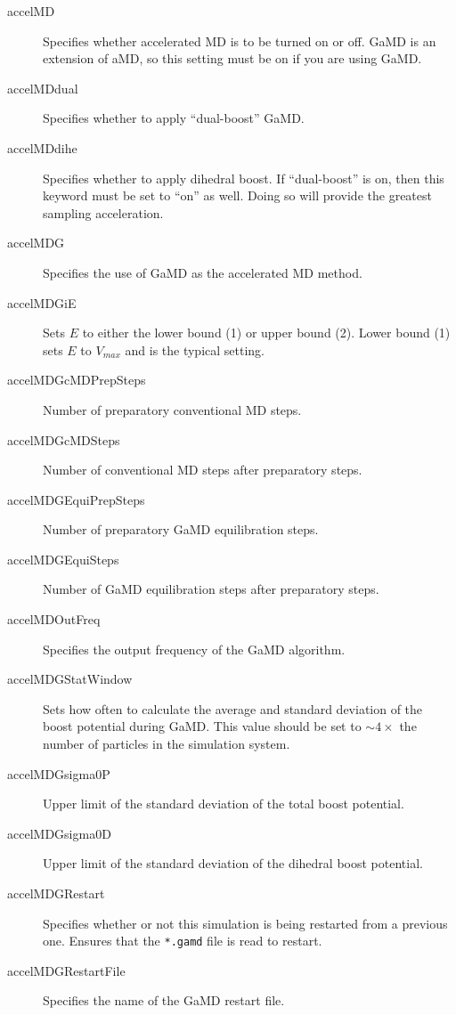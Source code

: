 \documentclass[9pt,tutorial]{livecoms}
\begin{document}
\begin{description}
    \item[accelMD] Specifies whether accelerated MD is to be turned on or off. GaMD is an extension of aMD, so this setting must be on if you are using GaMD.
    \item[accelMDdual] Specifies whether to apply ``dual-boost'' GaMD.
    \item[accelMDdihe] Specifies whether to apply dihedral boost. If ``dual-boost'' is on, then this keyword must be set to ``on'' as well. Doing so will provide the greatest sampling acceleration.
    \item[accelMDG] Specifies the use of GaMD as the accelerated MD method.
    \item[accelMDGiE] Sets $E$ to either the lower bound (1) or upper bound (2). Lower bound (1) sets $E$ to $V_{max}$ and is the typical setting.
    \item[accelMDGcMDPrepSteps] Number of preparatory conventional MD steps.
    \item[accelMDGcMDSteps] Number of conventional MD steps after preparatory steps.
    \item[accelMDGEquiPrepSteps] Number of preparatory GaMD equilibration steps.
    \item[accelMDGEquiSteps]  Number of GaMD equilibration steps after preparatory steps.
    \item[accelMDOutFreq] Specifies the output frequency of the GaMD algorithm.
    \item[accelMDGStatWindow]  Sets how often to calculate the average and standard deviation of the boost potential during GaMD. This value should be set to $\sim4\times$ the number of particles in the simulation system.
    \item[accelMDGsigma0P] Upper limit of the standard deviation of the total boost potential.
    \item[accelMDGsigma0D] Upper limit of the standard deviation of the dihedral boost potential.
    \item[accelMDGRestart] Specifies whether or not this simulation is being restarted from a previous one. Ensures that the \texttt{*.gamd} file is read to restart. 
    \item[accelMDGRestartFile] Specifies the name of the GaMD restart file.
\end{description}

\bigskip
\end{document}
